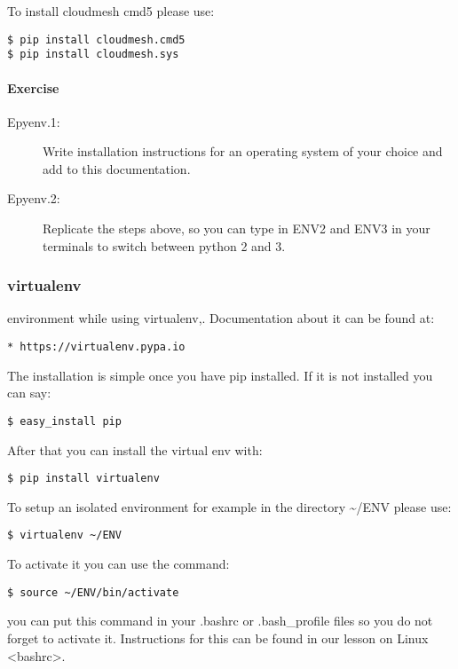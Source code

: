 To install cloudmesh cmd5 please use:

\begin{verbatim}
$ pip install cloudmesh.cmd5
$ pip install cloudmesh.sys
\end{verbatim}

\paragraph{Exercise}\label{exercise}

\begin{description}
\item[Epyenv.1:]
Write installation instructions for an operating system of your choice
and add to this documentation.
\item[Epyenv.2:]
Replicate the steps above, so you can type in ENV2 and ENV3 in your
terminals to switch between python 2 and 3.
\end{description}

\subsubsection{virtualenv}\label{virtualenv}

environment while using virtualenv,. Documentation about it can be found
at:

\begin{verbatim}
* https://virtualenv.pypa.io
\end{verbatim}

The installation is simple once you have pip installed. If it is not
installed you can say:

\begin{verbatim}
$ easy_install pip
\end{verbatim}

After that you can install the virtual env with:

\begin{verbatim}
$ pip install virtualenv
\end{verbatim}

To setup an isolated environment for example in the directory
\textasciitilde{}/ENV please use:

\begin{verbatim}
$ virtualenv ~/ENV
\end{verbatim}

To activate it you can use the command:

\begin{verbatim}
$ source ~/ENV/bin/activate
\end{verbatim}

you can put this command in your .bashrc or .bash\_profile files so you
do not forget to activate it. Instructions for this can be
found in our lesson on Linux \textless{}bashrc\textgreater{}.
